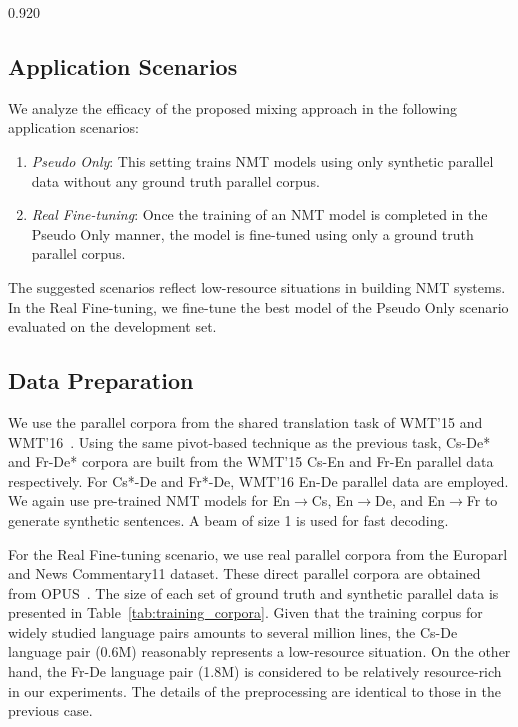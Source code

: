 \documentclass[11pt,letterpaper]{article}
\newcommand{\mylinespacing}{0.920}
\begin{document}
\begin{spacing}{\mylinespacing}
\subsection{Application Scenarios}
We analyze the efficacy of the proposed mixing approach in the following application scenarios:

\begin{enumerate}[label=(\roman*)]
\item \textit{Pseudo Only}: This setting trains NMT models using only synthetic parallel data without any ground truth parallel corpus.

\item \textit{Real Fine-tuning}: Once the training of an NMT model is completed in the Pseudo Only manner, the model is fine-tuned using only a ground truth parallel corpus.

\end{enumerate}

The suggested scenarios reflect low-resource situations in building NMT systems. In the Real Fine-tuning, we fine-tune the best model of the Pseudo Only scenario evaluated on the development set.

\subsection{Data Preparation}
We use the parallel corpora from the shared translation task of WMT'15 and WMT'16~\cite{bojar-EtAl:2016:WMT1}. Using the same pivot-based technique as the previous task, Cs-De* and Fr-De* corpora are built from the WMT'15 Cs-En and Fr-En parallel data respectively. For Cs*-De and Fr*-De, WMT'16 En-De parallel data are employed. We again use pre-trained NMT models for En\(\rightarrow\)Cs, En\(\rightarrow\)De, and En\(\rightarrow\)Fr to generate synthetic sentences. A beam of size 1 is used for fast decoding.

For the Real Fine-tuning scenario, we use real parallel corpora from the Europarl and News Commentary11 dataset. These direct parallel corpora are obtained from OPUS~\cite{tiedemann2012parallel}. The size of each set of ground truth and synthetic parallel data is presented in Table~\ref{tab:training_corpora}. Given that the training corpus for widely studied language pairs amounts to several million lines, the Cs-De language pair (0.6M) reasonably represents a low-resource situation. On the other hand, the Fr-De language pair (1.8M) is considered to be relatively resource-rich in our experiments. The details of the preprocessing are identical to those in the previous case.


\end{spacing}
\end{document}
